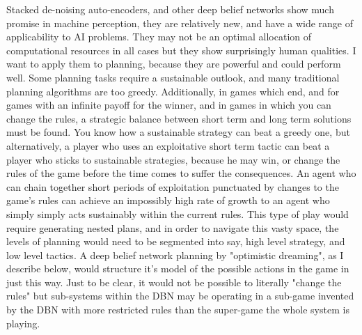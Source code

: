 \documentclass[11pt]{article}
\begin{document}
Stacked de-noising auto-encoders, and other deep belief networks show much promise in machine perception, they are relatively new, and have a wide range of applicability to AI problems. They may not be an optimal allocation of computational resources in all cases but they show surprisingly human qualities. I want to apply them to planning, because they are powerful and could perform well. Some planning tasks require a sustainable outlook, and many traditional planning algorithms are too greedy. Additionally, in games which end, and for games with an infinite payoff for the winner, and in games in which you can change the rules, a strategic balance between short term and long term solutions must be found. You know how a sustainable strategy can beat a greedy one, but alternatively, a player who uses an exploitative short term tactic can beat a player who sticks to sustainable strategies, because he may win, or change the rules of the game before the time comes to suffer the consequences. An agent who can chain together short periods of exploitation punctuated by changes to the game's rules can achieve an impossibly high rate of growth to an agent who simply simply acts sustainably within the current rules. This type of play would require generating nested plans, and in order to navigate this vasty space, the levels of planning would need to be segmented into say, high level strategy, and low level tactics. A deep belief network planning by "optimistic dreaming", as I describe below, would structure it's model of the possible actions in the game in just this way. Just to be clear, it would not be possible to literally "change the rules" but sub-systems within the DBN may be operating in a sub-game invented by the DBN with more restricted rules than the super-game the whole system is playing.
\end{document}
